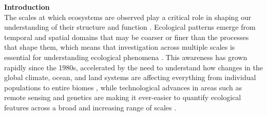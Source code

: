 \documentclass[12pt]{article}
\begin{document}


\vspace{10pt}
\noindent \textbf{Introduction}
\vspace{5pt}
\\
The scales at which ecosystems are observed play a critical role in shaping our understanding of their structure and function \cite{levin_problem_1992,chave_problem_2013,wiens_spatial_1989}.  Ecological patterns emerge from temporal and spatial domains that may be coarser or finer than the processes that shape them, which means that investigation across multiple scales is essential for understanding ecological phenomena \cite{levin_problem_1992,sandel_scale_2009}. This awareness has grown rapidly since the 1980s, accelerated by the need to understand how changes in the global climate, ocean, and land systems are affecting everything from individual populations \cite{tingley_push_2012} to entire biomes \cite{xiao_photosynthetic_2004}, while technological advances in areas such as remote sensing and genetics are making it ever-easier to quantify ecological features across a broad and increasing range of scales \cite{schneider_rise_2001, chave_problem_2013}.  
\end{document}
